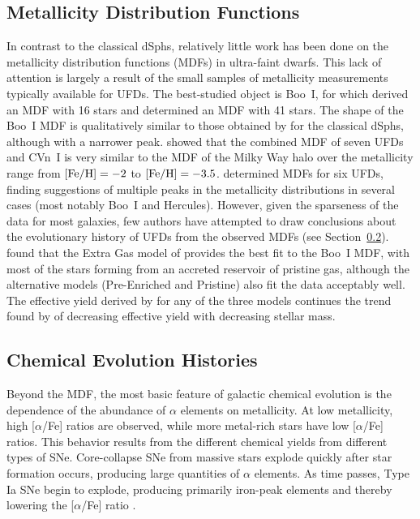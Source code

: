 \documentclass[a4paper]{ar-1col}
\newcommand{\feh}         {[Fe/H]}
\begin{document}
\subsection{Metallicity Distribution Functions}

In contrast to the classical dSphs, relatively little work has been
done on the metallicity distribution functions (MDFs) in ultra-faint
dwarfs.  This lack of attention is largely a result of the small
samples of metallicity measurements typically available for UFDs.  The
best-studied object is Boo~I, for which \citet{norris10} derived an
MDF with 16 stars and \citet{lai11} determined an MDF with 41 stars.
The shape of the Boo~I MDF is qualitatively similar to those obtained
by \citet{kirby11} for the classical dSphs, although with a narrower
peak.  \citet{kirby08} showed that the combined MDF of seven UFDs and
CVn~I is very similar to the MDF of the Milky Way halo over the
metallicity range from ${\rm \feh} = -2$ to ${\rm \feh} = -3.5$.
\citet{brown14} determined MDFs for six UFDs, finding suggestions of
multiple peaks in the metallicity distributions in several cases (most
notably Boo~I and Hercules).  However, given the sparseness of the
data for most galaxies, few authors have attempted to draw conclusions
about the evolutionary history of UFDs from the observed MDFs (see
Section~\ref{sec:chem_evol}).  \citet{lai11} found that the Extra Gas
model of \citet{kirby11} provides the best fit to the Boo~I MDF, with
most of the stars forming from an accreted reservoir of pristine gas,
although the alternative \citeauthor{kirby11} models (Pre-Enriched and
Pristine) also fit the data acceptably well.  The effective yield
derived by \citet{lai11} for any of the three models continues the
trend found by \citet{kirby11} of decreasing effective yield with
decreasing stellar mass.


\subsection{Chemical Evolution Histories}
\label{sec:chem_evol}

Beyond the MDF, the most basic feature of galactic chemical evolution
is the dependence of the abundance of $\alpha$ elements on
metallicity.  At low metallicity, high [$\alpha$/Fe] ratios are
observed, while more metal-rich stars have low [$\alpha$/Fe] ratios.
This behavior results from the different chemical yields from
different types of SNe.  Core-collapse SNe from massive stars explode
quickly after star formation occurs, producing large quantities of
$\alpha$ elements.  As time passes, Type Ia SNe begin to explode,
producing primarily iron-peak elements and thereby lowering the
[$\alpha$/Fe] ratio \citep{tinsley79}.
\end{document}
